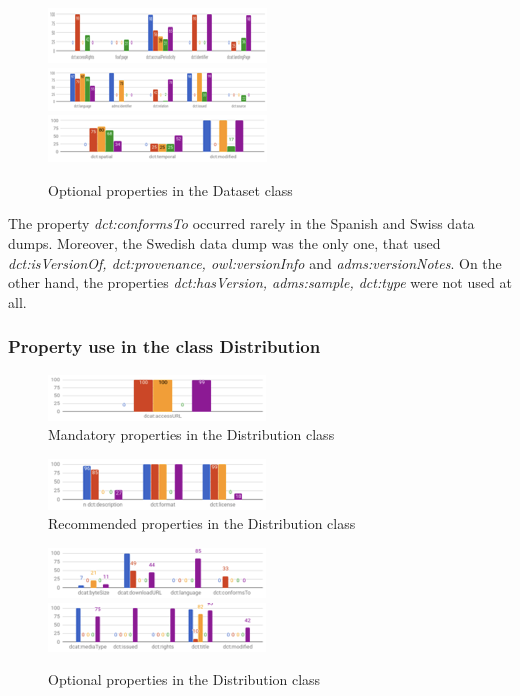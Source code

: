 \documentclass[<options>]{elsarticle}
\begin{document}
\begin{figure}[H]
\includegraphics{replace9.png}
\includegraphics{replace10.png}
\includegraphics{replace11.png}
\caption{Optional properties in the Dataset class}
\end{figure}


The property \textit{dct:conformsTo} occurred rarely in the Spanish and Swiss data dumps. Moreover, the Swedish data dump was the only one, that used \textit{dct:isVersionOf, dct:provenance, owl:versionInfo} and \textit{adms:versionNotes}. On the other hand, the properties  \textit{dct:hasVersion, adms:sample, dct:type} were not used at all.

\subsubsection{Property use in the class Distribution}

\begin{figure}[H]
\includegraphics{replace12.png}
\caption{Mandatory properties in the Distribution class}
\end{figure}

\begin{figure}[H]
\includegraphics{replace13.png}
\caption{Recommended properties in the Distribution class}
\end{figure}

\begin{figure}[H]
\includegraphics{replace14.png}
\includegraphics{replace15.png}
\caption{Optional properties in the Distribution class}
\end{figure}
\end{document}
